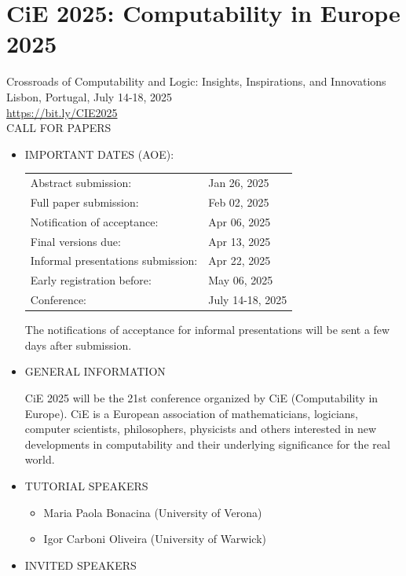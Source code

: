 \documentclass[prodmode,acmtecs]{acmsmall} %
\begin{document}
\section{CiE 2025: Computability in Europe 2025 }\label{CiE2025}  Crossroads of Computability and Logic: Insights, Inspirations, and Innovations\\ 
  Lisbon, Portugal, July 14-18, 2025\\ 
  \href{https://bit.ly/CIE2025}{https://bit.ly/CIE2025}\\ 
CALL FOR PAPERS 

\begin{itemize}\item  IMPORTANT DATES (AOE): 
 
\begin{tabulary}{\linewidth}{LL}Abstract submission:  & Jan 26, 2025 \\
Full paper submission:  & Feb 02, 2025 \\
Notification of acceptance:  & Apr 06, 2025 \\
Final versions due:  & Apr 13, 2025 \\
Informal presentations submission:  & Apr 22, 2025 \\
Early registration before:  & May 06, 2025 \\
Conference:  & July 14-18, 2025 \\
\end{tabulary}
 
  The notifications of acceptance for informal presentations will be sent a few days after submission. 
 
\item  GENERAL INFORMATION 
 
  CiE 2025 will be the 21st conference organized by CiE (Computability in Europe). CiE is a European association of mathematicians, logicians, computer scientists, philosophers, physicists and others interested in new developments in computability and their underlying significance for the real world. 
 
\item  TUTORIAL SPEAKERS 
 
\begin{itemize}\item  Maria Paola Bonacina (University of Verona)
\item  Igor Carboni Oliveira (University of Warwick)
\end{itemize} 
\item  INVITED SPEAKERS 
 

\end{itemize}
\end{document}
